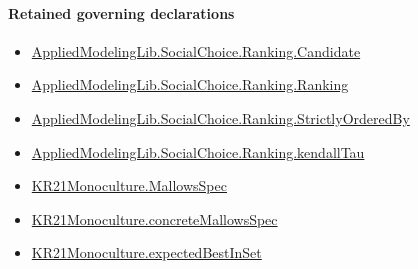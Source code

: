 \documentclass[10pt]{article}
\begin{document}
\paragraph{Retained governing declarations}
\begin{itemize}\raggedright
\item \hyperlink{library-prerequisite-8c0e6c25845ae78a}{Applied\allowbreak{}Modeling\allowbreak{}Lib.\allowbreak{}Social\allowbreak{}Choice.\allowbreak{}Ranking.\allowbreak{}Candidate}
\item \hyperlink{library-prerequisite-5cde54446d1ae021}{Applied\allowbreak{}Modeling\allowbreak{}Lib.\allowbreak{}Social\allowbreak{}Choice.\allowbreak{}Ranking.\allowbreak{}Ranking}
\item \hyperlink{library-prerequisite-3585717d1635654a}{Applied\allowbreak{}Modeling\allowbreak{}Lib.\allowbreak{}Social\allowbreak{}Choice.\allowbreak{}Ranking.\allowbreak{}Strictly\allowbreak{}Ordered\allowbreak{}By}
\item \hyperlink{governing-declaration-127efd44d176e2ba}{Applied\allowbreak{}Modeling\allowbreak{}Lib.\allowbreak{}Social\allowbreak{}Choice.\allowbreak{}Ranking.\allowbreak{}kendall\allowbreak{}Tau}
\item \hyperlink{governing-declaration-b2e6ec0602659b07}{KR21\allowbreak{}Monoculture.\allowbreak{}Mallows\allowbreak{}Spec}
\item \hyperlink{governing-declaration-0e399c7dd166853c}{KR21\allowbreak{}Monoculture.\allowbreak{}concrete\allowbreak{}Mallows\allowbreak{}Spec}
\item \hyperlink{paper-prerequisite-b8698660538f90e1}{KR21\allowbreak{}Monoculture.\allowbreak{}expected\allowbreak{}Best\allowbreak{}In\allowbreak{}Set}
\end{itemize}
\end{document}
